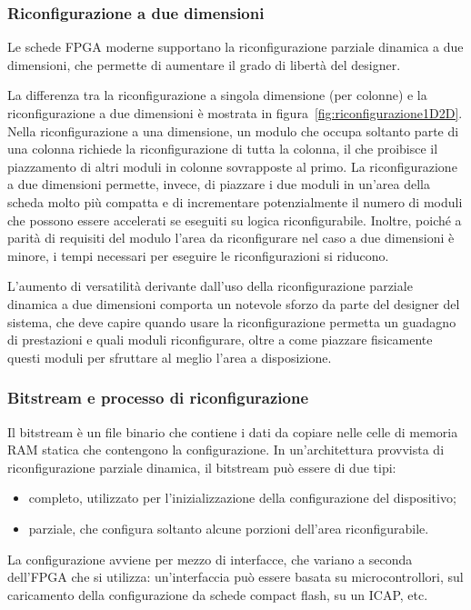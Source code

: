 \subsubsection{Riconfigurazione a due dimensioni}
Le schede \ac{FPGA} moderne supportano la riconfigurazione parziale dinamica a due dimensioni,
che permette di aumentare il grado di libertà del designer.

La differenza tra la riconfigurazione a singola dimensione (per colonne) e la
riconfigurazione a due dimensioni è mostrata in figura~\ref{fig:riconfigurazione1D2D}.
Nella riconfigurazione a una dimensione, un modulo che occupa soltanto parte di una
colonna richiede la riconfigurazione di tutta la colonna, il che proibisce il piazzamento
di altri moduli in colonne sovrapposte al primo. La riconfigurazione a due dimensioni
permette, invece, di piazzare i due moduli in un'area della scheda molto più compatta e di
incrementare potenzialmente il numero di moduli che possono essere accelerati se eseguiti
su logica riconfigurabile. Inoltre, poich\'e a parit\`a di requisiti del modulo l'area da
riconfigurare nel caso a due dimensioni \`e minore, i tempi necessari per eseguire
le riconfigurazioni si riducono.

L'aumento di versatilità derivante dall'uso della riconfigurazione parziale dinamica
a due dimensioni comporta un notevole sforzo da parte del designer del sistema,
che deve capire quando usare la riconfigurazione permetta un guadagno di prestazioni
e quali moduli riconfigurare, oltre a come piazzare fisicamente questi moduli per sfruttare al
meglio l'area a disposizione.

\subsubsection{Bitstream e processo di riconfigurazione}
Il bitstream è un file binario che contiene i dati da copiare nelle celle di memoria RAM
statica che contengono la configurazione. In un'architettura provvista di
riconfigurazione parziale dinamica, il bitstream può essere di due tipi:
\begin{itemize}
 \item completo, utilizzato per l'inizializzazione della configurazione del dispositivo;
 \item parziale, che configura soltanto alcune porzioni dell'area riconfigurabile.
\end{itemize}

La configurazione avviene per mezzo di interfacce, che variano a seconda dell'\ac{FPGA}
che si utilizza: un'interfaccia può essere basata su microcontrollori, sul caricamento
della configurazione da schede compact flash, su un \ac{ICAP}, etc.

